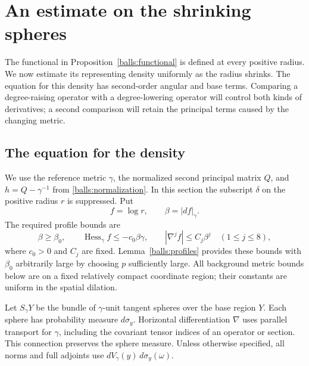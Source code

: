 \section{An estimate on the shrinking spheres}
\label{sec:angular}

The functional in Proposition~\ref{balls:functional} is defined at every positive
radius.  We now estimate its representing density uniformly as the radius
shrinks.  The equation for this density has second-order angular and base
terms.  Comparing a degree-raising operator with a degree-lowering operator
will control both kinds of derivatives; a second comparison will retain the
principal terms caused by the changing metric.

\subsection{The equation for the density}

We use the reference metric $\gamma$, the normalized second principal
matrix $Q$, and $h=Q-\gamma^{-1}$ from
\eqref{balls:normalization}.  In this section the subscript $\delta$ on the positive
radius $r$ is suppressed.  Put
\[
 f=\log r,\qquad \beta=|df|_\gamma.
\]
The required profile bounds are
\begin{equation}\label{angular:profile-bounds}
 \beta\ge\beta_0,\qquad
 \operatorname{Hess}_\gamma f\le-c_0\beta\gamma,
 \qquad |\nabla^j f|\le C_j\beta^j\quad(1\le j\le8),
\end{equation}
where $c_0>0$ and $C_j$ are fixed.  Lemma~\ref{balls:profiles} provides
these bounds with $\beta_0$ arbitrarily large by choosing $p$
sufficiently large.  All background metric bounds
below are on a fixed relatively compact coordinate region; their constants
are uniform in the spatial dilation.

Let $S_\gamma Y$ be the bundle of $\gamma$-unit tangent spheres over the
base region $Y$.  Each sphere has probability measure $d\sigma_y$.
Horizontal differentiation $\nabla$ uses parallel transport for $\gamma$,
including the covariant tensor indices of an operator or section.  This
connection preserves the sphere measure.  Unless otherwise specified, all
norms and full adjoints use $dV_\gamma(y)\,d\sigma_y(\omega)$.

